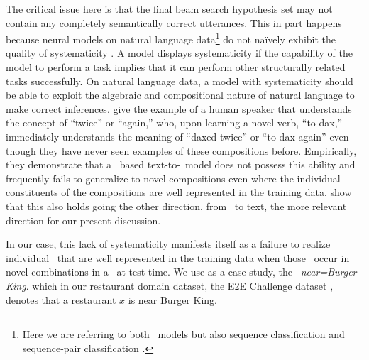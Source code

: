 The critical issue here is that the final beam search hypothesis set may not
contain any completely semantically correct utterances.  This in part happens
because neural models on natural language data\footnote{Here we are referring
to both \sequencetosequence~models but also sequence classification
\citep{kim2014convolutional,mccoy2019} and sequence-pair classification
\citep{he2019}. }  do not na{\"i}vely exhibit the quality of systematicity
\citep{fodor1988,phillips1998,marcus2003,lake18,mccoy2019,gardner2020}. A model
displays systematicity if the capability of the model to  perform a task
implies that it can perform other structurally related tasks successfully.  On
natural language data, a model with systematicity should be able to exploit the
algebraic and compositional nature of natural language to make correct
inferences. \citet{lake18} give the example of a human speaker that understands
the concept of ``twice'' or ``again,'' who, upon learning a novel verb, ``to
dax,'' immediately understands the meaning of ``daxed twice'' or ``to dax
again'' even though they have never seen examples of these compositions before.
Empirically, they demonstrate that a \recurrentneuralnetwork~based
text-to-\meaningrepresentation~model  does not possess this ability and
frequently fails to generalize to novel compositions even where the individual
constituents of the compositions are well represented in the training data.
\cite{bastings2018} show that this also holds going the other direction, from
\meaningrepresentation~to text, the more relevant direction for our present
discussion.

In our case, this lack of systematicity manifests itself as a failure to
realize individual \attributevalues~that are well represented in the training
data when those \attributevalues~occur in novel combinations in a
\meaningrepresentation~at test time. We use as a case-study, the
\attributevalue~\textit{near=Burger King}. which in our restaurant domain
dataset, the E2E Challenge dataset \citep{dusek2018}, denotes that a restaurant
$x$ is near Burger King. 

